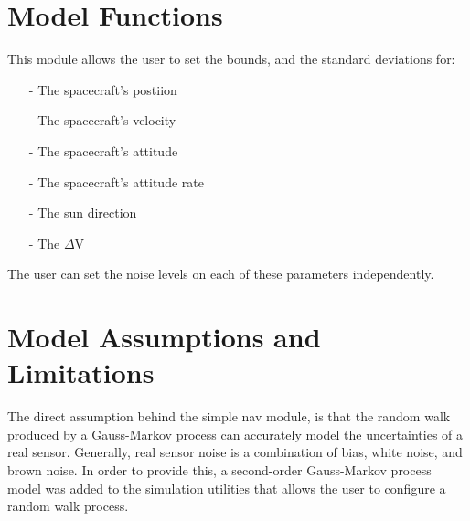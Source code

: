 \section{Model Functions}

This module allows the user to set the bounds, and the standard deviations for:

\begin{itemize}
\item[-] The spacecraft's postiion
\item[-] The spacecraft's velocity
\item[-] The spacecraft's attitude
\item[-] The spacecraft's attitude rate
\item[-] The sun direction
\item[-] The $\Delta $V
\end{itemize}

The user can set the noise levels on each of these parameters independently. 



\section{Model Assumptions and Limitations}

The direct assumption behind the simple nav module, is that the random walk produced by a Gauss-Markov process can accurately model the uncertainties of a real sensor. 
Generally, real sensor noise is a combination of bias, white noise, 
and brown noise.  In order to provide this, a second-order 
Gauss-Markov process model was added to the simulation utilities that allows 
the user to configure a random walk process. 